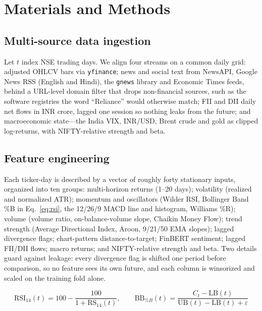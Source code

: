 \documentclass[12pt,a4paper]{article}
\begin{document}
\section{Materials and Methods}

\subsection{Multi-source data ingestion}

Let $t$ index NSE trading days. We align four streams on a common daily grid:
adjusted OHLCV bars via \texttt{yfinance}; news and social text from NewsAPI,
Google News RSS (English and Hindi), the \texttt{gnews} library and Economic Times
feeds, behind a URL-level domain filter that drops non-financial sources, such as
the software registries the word ``Reliance'' would otherwise match; FII and DII
daily net flows in INR crore, lagged one session so nothing leaks from the future;
and macroeconomic state---the India VIX, INR/USD, Brent crude and gold as clipped
log-returns, with NIFTY-relative strength and beta.

\subsection{Feature engineering}

Each ticker-day is described by a vector of roughly forty stationary inputs,
organized into ten groups: multi-horizon returns (1--20 days); volatility
(realized and normalized ATR); momentum and oscillators (Wilder RSI, Bollinger
Band \%B in Eq.~\eqref{eq:rsi}, the 12/26/9 MACD line and histogram, Williams \%R);
volume (volume ratio, on-balance-volume slope, Chaikin Money Flow); trend strength
(Average Directional Index, Aroon, 9/21/50 EMA slopes); lagged divergence flags;
chart-pattern distance-to-target; FinBERT sentiment; lagged FII/DII flows; macro
returns; and NIFTY-relative strength and beta. Two details guard against leakage:
every divergence flag is shifted one period before comparison, so no feature sees
its own future, and each column is winsorized and scaled on the training fold
alone.

\begin{equation}
\mathrm{RSI}_{14}(t)=100-\frac{100}{1+\mathrm{RS}_{14}(t)},\qquad
\mathrm{BB}_{\%B}(t)=\frac{C_t-\mathrm{LB}(t)}{\mathrm{UB}(t)-\mathrm{LB}(t)+\varepsilon}
\label{eq:rsi}
\end{equation}
\end{document}
